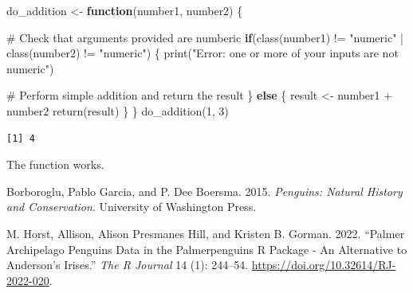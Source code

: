 \documentclass[
  letterpaper,
  DIV=11,
  numbers=noendperiod]{scrartcl}
\newenvironment{Shaded}{\begin{snugshade}}{\end{snugshade}}
\newcommand{\CommentTok}[1]{\textcolor[rgb]{0.37,0.37,0.37}{#1}}
\newcommand{\ControlFlowTok}[1]{\textcolor[rgb]{0.00,0.23,0.31}{\textbf{#1}}}
\newcommand{\DecValTok}[1]{\textcolor[rgb]{0.68,0.00,0.00}{#1}}
\newcommand{\FunctionTok}[1]{\textcolor[rgb]{0.28,0.35,0.67}{#1}}
\newcommand{\NormalTok}[1]{\textcolor[rgb]{0.00,0.23,0.31}{#1}}
\newcommand{\OtherTok}[1]{\textcolor[rgb]{0.00,0.23,0.31}{#1}}
\newcommand{\SpecialCharTok}[1]{\textcolor[rgb]{0.37,0.37,0.37}{#1}}
\newcommand{\StringTok}[1]{\textcolor[rgb]{0.13,0.47,0.30}{#1}}
\newlength{\cslhangindent}
\newenvironment{CSLReferences}[2] %
 {\begin{list}{}{%
  \setlength{\itemindent}{0pt}
  \setlength{\leftmargin}{0pt}
  \setlength{\parsep}{0pt}
  \ifodd #1
   \setlength{\leftmargin}{\cslhangindent}
   \setlength{\itemindent}{-1\cslhangindent}
  \fi
  \setlength{\itemsep}{#2\baselineskip}}}
 {\end{list}}
\begin{document}
\begin{Shaded}
\begin{Highlighting}[]
\NormalTok{do\_addition }\OtherTok{\textless{}{-}} \ControlFlowTok{function}\NormalTok{(number1, number2) \{}
        
        \CommentTok{\# Check that arguments provided are numberic}
        \ControlFlowTok{if}\NormalTok{(}\FunctionTok{class}\NormalTok{(number1) }\SpecialCharTok{!=} \StringTok{"numeric"} \SpecialCharTok{|} \FunctionTok{class}\NormalTok{(number2) }\SpecialCharTok{!=} \StringTok{"numeric"}\NormalTok{) \{}
                \FunctionTok{print}\NormalTok{(}\StringTok{"Error: one or more of your inputs are not numeric"}\NormalTok{)}
                
        \CommentTok{\# Perform simple addition and return the result}
\NormalTok{        \} }\ControlFlowTok{else}\NormalTok{ \{}
\NormalTok{                result }\OtherTok{\textless{}{-}}\NormalTok{ number1 }\SpecialCharTok{+}\NormalTok{ number2}
                \FunctionTok{return}\NormalTok{(result)}
\NormalTok{        \}}
\NormalTok{\}}
\FunctionTok{do\_addition}\NormalTok{(}\DecValTok{1}\NormalTok{, }\DecValTok{3}\NormalTok{)}
\end{Highlighting}
\end{Shaded}

\begin{verbatim}
[1] 4
\end{verbatim}

The function works.

\protect{}\label{refs}
\begin{CSLReferences}{1}{1}
Borboroglu, Pablo Garcia, and P. Dee Boersma. 2015. \emph{Penguins:
{Natural History} and {Conservation}}. University of Washington Press.

M. Horst, Allison, Alison Presmanes Hill, and Kristen B. Gorman. 2022.
{``Palmer {Archipelago Penguins Data} in the Palmerpenguins {R Package}
- {An Alternative} to {Anderson}'s {Irises}.''} \emph{The R Journal} 14
(1): 244--54. \url{https://doi.org/10.32614/RJ-2022-020}.

\end{CSLReferences}
\end{document}
